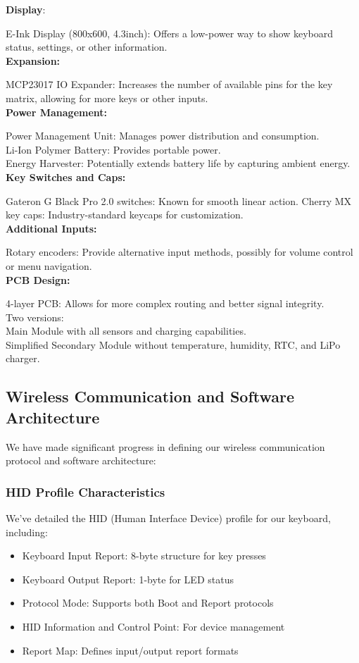\documentclass[a4paper,11pt]{article}%
\begin{document}
\textbf{Display}:

E-Ink Display (800x600, 4.3inch): Offers a low-power way to show keyboard status, settings, or other information.\\

\textbf{Expansion:}

MCP23017 IO Expander: Increases the number of available pins for the key matrix, allowing for more keys or other inputs.\\

\textbf{Power Management:}

Power Management Unit: Manages power distribution and consumption.\\
Li-Ion Polymer Battery: Provides portable power.\\
Energy Harvester: Potentially extends battery life by capturing ambient energy.\\

\textbf{Key Switches and Caps:}

Gateron G Black Pro 2.0 switches: Known for smooth linear action.
Cherry MX key caps: Industry-standard keycaps for customization.\\

\textbf{Additional Inputs:}

Rotary encoders: Provide alternative input methods, possibly for volume control or menu navigation.\\


\textbf{PCB Design:}

4-layer PCB: Allows for more complex routing and better signal integrity.\\
Two versions:\\

Main Module with  all sensors and charging capabilities.\\
Simplified Secondary Module without temperature, humidity, RTC, and LiPo charger.\\


\subsection{Wireless Communication and Software Architecture}

We have made significant progress in defining our wireless communication protocol and software architecture:

\subsubsection{HID Profile Characteristics}
We've detailed the HID (Human Interface Device) profile for our keyboard, including:
\begin{itemize}
    \item Keyboard Input Report: 8-byte structure for key presses
    \item Keyboard Output Report: 1-byte for LED status
    \item Protocol Mode: Supports both Boot and Report protocols
    \item HID Information and Control Point: For device management
    \item Report Map: Defines input/output report formats
\end{itemize}
\end{document}
